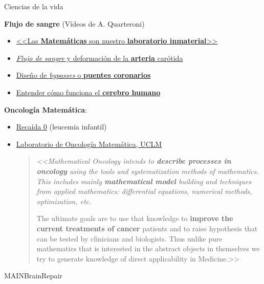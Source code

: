 \documentclass[
  unknownkeysallowed %
]{beamer}
\begin{document}
\begin{frame}{Ciencias de la vida}

  {\large\bf Flujo de sangre} (Vídeos de A. Quarteroni)

  \begin{itemize}
  \item \href{https://youtu.be/8W4oFOymiyM?t=511}{<<Las
      \textbf{Matemáticas} son nuestro \textbf{laboratorio
        inmaterial}>>}
  \item \href{https://youtu.be/8W4oFOymiyM?t=645}{\textit{Flujo de sangre} y deformación de la \textbf{arteria} carótida}
  \item \href{https://youtu.be/8W4oFOymiyM?t=787}{Diseño de \textit{bypasses} o \textbf{puentes coronarios}}
  \item \href{https://youtu.be/8W4oFOymiyM?t=823}{Entender cómo funciona el \textbf{cerebro humano}}
  \end{itemize}
  \bigskip
  {\large\bf Oncología Matemática}:
  \begin{itemize}
  \item \href{https://es-es.facebook.com/recaida0/}{Recaída 0} (leucemia infantil)
  \item
    \href{http://matematicas.uclm.es/imaci/molab/mathoncol}{Laboratorio
      de Oncología Matemática, UCLM}
    \begin{quotation}\scriptsize\em
      <<Mathematical Oncology intends to \textbf{describe processes in oncology}
      using the tools and systematization methods of mathematics. This
      includes mainly \textbf{mathematical model} building and techniques from
      applied mathematics: differential equations, numerical methods,
      optimization, etc.

      The ultimate goals are to use that knowledge to \textbf{improve the
      current treatments of cancer} patients and to raise hypothesis
      that can be tested by clinicians and biologists. Thus unlike
      pure mathematics that is interested in the abstract objects in
      themselves we try to generate knowledge of direct applicability
      in Medicine.>>
    \end{quotation}
  \end{itemize}
\end{frame}

\begin{frame}{MAINBrainRepair}

\end{frame}

\end{document}
